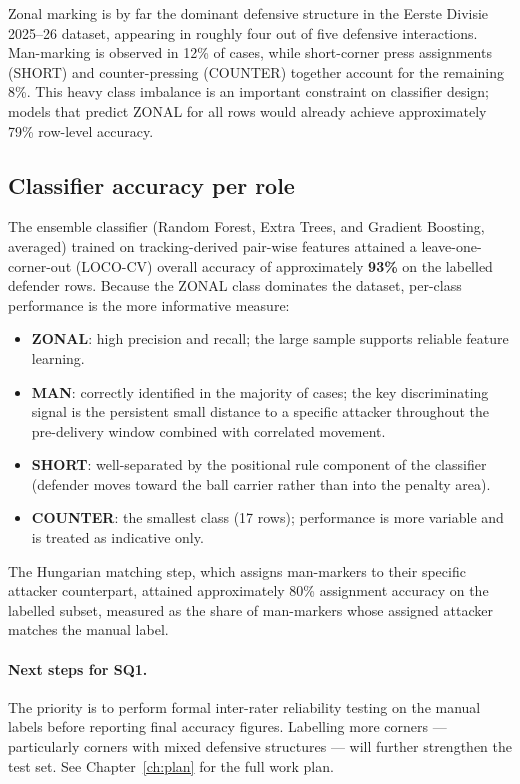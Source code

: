 Zonal marking is by far the dominant defensive structure in the Eerste
Divisie 2025--26 dataset, appearing in roughly four out of five
defensive interactions. Man-marking is observed in 12\% of cases,
while short-corner press assignments (SHORT) and counter-pressing
(COUNTER) together account for the remaining 8\%. This heavy class
imbalance is an important constraint on classifier design; models that
predict ZONAL for all rows would already achieve approximately 79\%
row-level accuracy.

\subsection{Classifier accuracy per role}

The ensemble classifier (Random Forest, Extra Trees, and Gradient
Boosting, averaged) trained on tracking-derived pair-wise features
attained a leave-one-corner-out (LOCO-CV) overall accuracy of
approximately \textbf{93\%} on the labelled defender rows. Because the
ZONAL class dominates the dataset, per-class performance is the more
informative measure:

\begin{itemize}
  \item \textbf{ZONAL}: high precision and recall; the large sample
        supports reliable feature learning.
  \item \textbf{MAN}: correctly identified in the majority of cases;
        the key discriminating signal is the persistent small distance
        to a specific attacker throughout the pre-delivery window
        combined with correlated movement.
  \item \textbf{SHORT}: well-separated by the positional rule component
        of the classifier (defender moves toward the ball carrier rather
        than into the penalty area).
  \item \textbf{COUNTER}: the smallest class (17 rows); performance is
        more variable and is treated as indicative only.
\end{itemize}

The Hungarian matching step, which assigns man-markers to their
specific attacker counterpart, attained approximately 80\% assignment
accuracy on the labelled subset, measured as the share of man-markers
whose assigned attacker matches the manual label.

\paragraph{Next steps for SQ1.}
The priority is to perform formal inter-rater reliability testing on
the manual labels before reporting final accuracy figures. Labelling
more corners — particularly corners with mixed defensive structures —
will further strengthen the test set. See
Chapter~\ref{ch:plan} for the full work plan.


